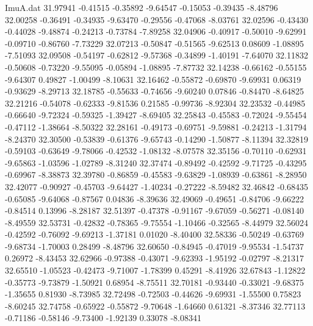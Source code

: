 \begin{filecontents}{ImuA.dat}
  31.97941   -0.41515   -0.35892   -9.64547   -0.15053   -0.39435   -8.48796
  32.00258   -0.36491   -0.34935   -9.63470   -0.29556   -0.47068   -8.03761
  32.02596   -0.43430   -0.44028   -9.48874   -0.24213   -0.73784   -7.89258
  32.04906   -0.40917   -0.50010   -9.62991   -0.09710   -0.86760   -7.73229
  32.07213   -0.50847   -0.51565   -9.62513    0.08609   -1.08895   -7.51093
  32.09508   -0.54197   -0.62812   -9.57368   -0.34899   -1.40191   -7.64070
  32.11832   -0.50608   -0.73220   -9.55095   -0.05894   -1.08895   -7.87732
  32.14238   -0.66162   -0.55155   -9.64307    0.49827   -1.00499   -8.10631
  32.16462   -0.55872   -0.69870   -9.69931    0.06319   -0.93629   -8.29713
  32.18785   -0.55633   -0.74656   -9.60240    0.07846   -0.84470   -8.64825
  32.21216   -0.54078   -0.62333   -9.81536    0.21585   -0.99736   -8.92304
  32.23532   -0.44985   -0.66640   -9.72324   -0.59325   -1.39427   -8.69405
  32.25843   -0.45583   -0.72024   -9.55454   -0.47112   -1.38664   -8.50322
  32.28161   -0.49173   -0.69751   -9.59881   -0.24213   -1.31794   -8.24370
  32.30500   -0.53839   -0.61376   -9.65743   -0.14290   -1.50877   -8.11394
  32.32819   -0.59103   -0.63649   -9.78066   -0.42532   -1.08132   -8.07578
  32.35156   -0.70110   -0.62931   -9.65863   -1.03596   -1.02789   -8.31240
  32.37474   -0.89492   -0.42592   -9.71725   -0.43295   -0.69967   -8.38873
  32.39780   -0.86859   -0.45583   -9.63829   -1.08939   -0.63861   -8.28950
  32.42077   -0.90927   -0.45703   -9.64427   -1.40234   -0.27222   -8.59482
  32.46842   -0.68435   -0.65085   -9.64068   -0.87567    0.04836   -8.39636
  32.49069   -0.49651   -0.84706   -9.66222   -0.84514    0.13996   -8.28187
  32.51397   -0.47378   -0.91167   -9.67059   -0.56271   -0.08140   -8.49559
  32.53731   -0.42832   -0.78365   -9.75554   -1.10466   -0.32565   -8.44979
  32.56024   -0.42592   -0.76092   -9.69213   -1.37181    0.01020   -8.40400
  32.58336   -0.50249   -0.63769   -9.68734   -1.70003    0.28499   -8.48796
  32.60650   -0.84945   -0.47019   -9.95534   -1.54737    0.26972   -8.43453
  32.62966   -0.97388   -0.43071   -9.62393   -1.95192   -0.02797   -8.21317
  32.65510   -1.05523   -0.42473   -9.71007   -1.78399    0.45291   -8.41926
  32.67843   -1.12822   -0.35773   -9.73879   -1.50921    0.68954   -8.75511
  32.70181   -0.93440   -0.33021   -9.68375   -1.35655    0.81930   -8.73985
  32.72498   -0.72503   -0.44626   -9.69931   -1.55500    0.75823   -8.60245
  32.74758   -0.65922   -0.55872   -9.70648   -1.64660    0.61321   -8.37346
  32.77113   -0.71186   -0.58146   -9.73400   -1.92139    0.33078   -8.08341

\end{filecontents}
